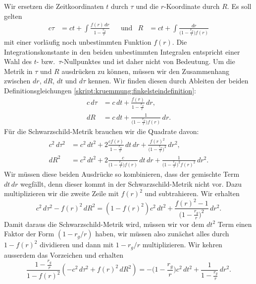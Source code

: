 Wir ersetzen die Zeitkoordinaten $t$ durch $\tau$ und die $r$-Koordinate
durch $R$.
Es soll gelten
\begin{equation}
\begin{aligned}
c\tau
&=
ct + \int\frac{f(r)\,dr}{\displaystyle 1-\frac{r_g}{r}}
&
&\text{und}
&
R
&=
ct
+
\int\frac{dr}{\displaystyle \biggl(1-\frac{r_g}{r}\biggr)f(r)}
\end{aligned}
\label{skript:kruemmung:finkelsteindefinition}
\end{equation}
mit einer vorläufig noch unbestimmten Funktion $f(r)$.
Die Integrationskonstante in den beiden unbestimmten Integralen
entspricht einer Wahl des $t$- bzw.~$\tau$-Nullpunktes und ist
daher nicht von Bedeutung.
Um die Metrik in $\tau$ und $R$ ausdrücken zu können, müssen wir 
den Zusammenhang zwischen $dr$, $dR$, $dt$ und $d\tau$ kennen.
Wir finden diesen durch Ableiten der beiden Definitionsgleichungen
\eqref{skript:kruemmung:finkelsteindefinition}:
\begin{align*}
c\,d\tau
&=
c\,dt + \frac{f(r)}{\displaystyle 1-\frac{r_g}{r}}\,dr,
\\
dR
&=
c\,dt
+
\frac{1}{\displaystyle\biggl(1-\frac{r_g}{r}\biggr)f(r)}\,dr.
\end{align*}
Für die Schwarzschild-Metrik brauchen wir die Quadrate davon:
\begin{align*}
c^2\,d\tau ^2
&=
c^2\,dt^2 + 2\frac{cf(r)}{\displaystyle 1-\frac{r_g}{r}}\,dt\,dr
+\frac{f(r)^2}{\biggl(\displaystyle 1-\frac{r_g}{r}\biggr)^2}\,dr^2,
\\
dR^2
&=
c^2\,dt^2 + 2\frac{c}{\displaystyle\biggl(1-\frac{r_g}{r}\biggr)f(r)}\,dt\,dr
+
\frac{1}{\displaystyle \biggl(1-\frac{r_g}{r}\biggr)^2f(r)^2}\,dr^2.
\end{align*}
Wir müssen diese beiden Ausdrücke so kombinieren, dass der gemischte
Term $dt\,dr$ wegfällt, denn dieser kommt in der Schwarzschild-Metrik
nicht vor.
Dazu multiplizieren wir die zweite Zeile mit $f(r)^2$ und subtrahieren.
Wir erhalten
\begin{equation}
c^2\,d\tau^2 - f(r)^2\,dR^2
=
(1-f(r)^2)c^2\,dt^2
+\frac{f(r)^2-1}{\displaystyle\biggl(1-\frac{r_g}{r}\biggr)^2}\,dr^2.
\end{equation}
Damit daraus die Schwarzschild-Metrik wird, müssen wir vor dem $dt^2$
Term einen Faktor der Form $(1-r_g/r)$ haben, wir müssen also zunächst
alles durch $1-f(r)^2$ dividieren und dann mit $1-r_g/r$ multiplizieren.
Wir kehren ausserdem das Vorzeichen und erhalten
\[
\frac{\displaystyle 1-\frac{r_g}{r}}{1-f(r)^2}
(-c^2\,d\tau^2 + f(r)^2\,dR^2)
=
-\biggl(1-\frac{r_g}{r}\biggr)c^2\,dt^2
+\frac{1}{\displaystyle 1-\frac{r_g}{r}}\,dr^2.
\]
